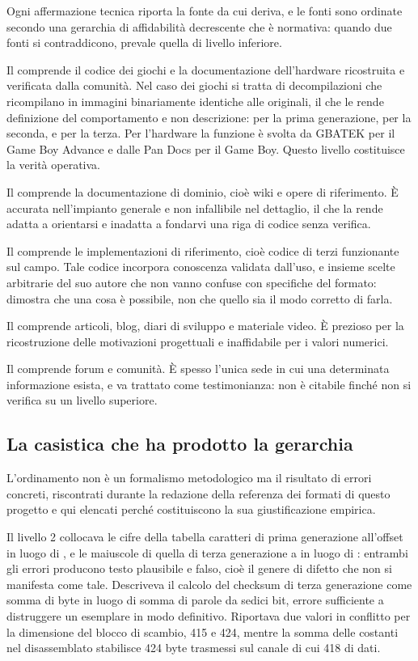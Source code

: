 Ogni affermazione tecnica riporta la fonte da cui deriva, e le fonti sono ordinate secondo
una gerarchia di affidabilità decrescente che è normativa: quando due fonti si
contraddicono, prevale quella di livello inferiore.

Il  comprende il codice dei giochi e la documentazione dell'hardware
ricostruita e verificata dalla comunità. Nel caso dei giochi si tratta di decompilazioni
che ricompilano in immagini binariamente identiche alle originali, il che le rende
definizione del comportamento e non descrizione:  per la prima generazione,
 per la seconda,  e  per la terza.
Per l'hardware la funzione è svolta da GBATEK per il Game Boy Advance e dalle Pan Docs per
il Game Boy. Questo livello costituisce la verità operativa.

Il  comprende la documentazione di dominio, cioè wiki e opere di
riferimento. È accurata nell'impianto generale e non infallibile nel dettaglio, il che la
rende adatta a orientarsi e inadatta a fondarvi una riga di codice senza verifica.

Il  comprende le implementazioni di riferimento, cioè codice di terzi
funzionante sul campo. Tale codice incorpora conoscenza validata dall'uso, e insieme scelte
arbitrarie del suo autore che non vanno confuse con specifiche del formato: dimostra che
una cosa è possibile, non che quello sia il modo corretto di farla.

Il  comprende articoli, blog, diari di sviluppo e materiale video. È
prezioso per la ricostruzione delle motivazioni progettuali e inaffidabile per i valori
numerici.

Il  comprende forum e comunità. È spesso l'unica sede in cui una
determinata informazione esista, e va trattato come testimonianza: non è citabile finché
non si verifica su un livello superiore.

\subsection*{La casistica che ha prodotto la gerarchia}

L'ordinamento non è un formalismo metodologico ma il risultato di errori concreti,
riscontrati durante la redazione della referenza dei formati di questo progetto e qui
elencati perché costituiscono la sua giustificazione empirica.

Il livello 2 collocava le cifre della tabella caratteri di prima generazione all'offset
 in luogo di , e le maiuscole di quella di terza generazione a  in
luogo di : entrambi gli errori producono testo plausibile e falso, cioè il genere di
difetto che non si manifesta come tale. Descriveva il calcolo del checksum di terza
generazione come somma di byte in luogo di somma di parole da sedici bit, errore
sufficiente a distruggere un esemplare in modo definitivo. Riportava due valori in
conflitto per la dimensione del blocco di scambio, 415 e 424, mentre la somma delle
costanti nel disassemblato stabilisce 424 byte trasmessi sul canale di cui 418 di dati.


